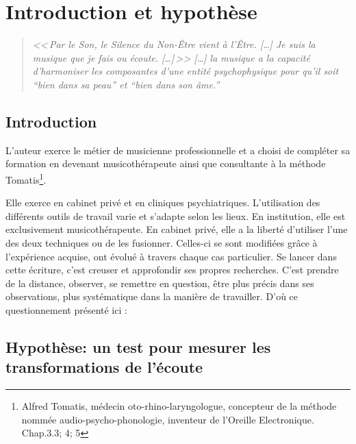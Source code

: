 \chapter{Introduction et hypothèse}
\label{jeSuisLaMusique:viret}
\begin{quotation}
\emph{<<\,\emph{Par le Son, le Silence du Non-Être vient à l'Être}. [\dots] 
\textsl{Je suis}
	\emph{la musique que je fais ou écoute}. [\dots]\,>>
[\ldots] \emph{la musique a la capacité d'harmoniser
les composantes d'une entité psychophysique pour qu'il soit ``bien
dans sa peau'' et ``bien dans son âme.}''}\, \autocite[ch. 1,  p. 8]{viret:b}
\end{quotation}

\section{Introduction}

L'auteur exerce le métier de musicienne professionnelle et a  choisi de 
compléter sa formation en devenant musicothérapeute  ainsi que consultante à la 
méthode Tomatis\footnote{Alfred Tomatis, médecin oto-rhino-laryngologue, 
concepteur de la méthode nommée audio-psycho-phonologie, inventeur de l'Oreille 
Electronique. Chap.3.3; 4; 5}.  



Elle exerce en cabinet privé et en cliniques psychiatriques. L'utilisation des 
différents outils de travail varie et s'adapte selon les lieux. En institution, 
elle est exclusivement musicothérapeute. En cabinet
privé, elle a la liberté d'utiliser l'une des deux techniques ou de les 
fusionner. Celles-ci se sont modifiées grâce à  l'expérience acquise, ont 
évolué  
à travers chaque cas particulier.
 Se lancer dans cette écriture, c'est creuser et approfondir ses propres 
recherches. C'est prendre de la distance, observer, se remettre en question, 
être plus précis dans ses observations, plus systématique dans la manière de 
travailler. D'où ce questionnement présenté ici : 


\section{Hypothèse: un test pour mesurer les trans\-for\-ma\-tions de l'écoute}

